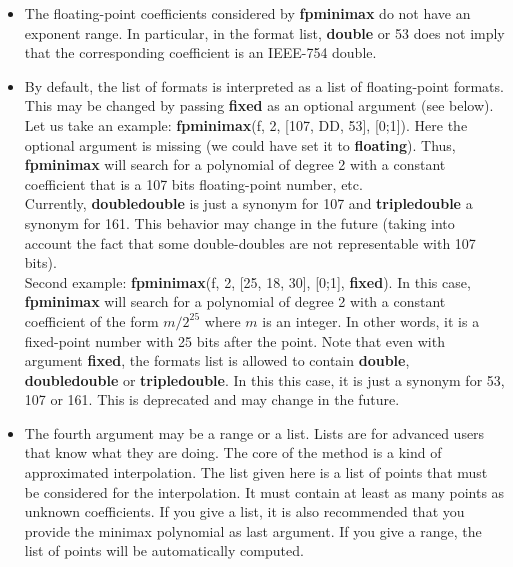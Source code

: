 \begin{itemize}
\item The floating-point coefficients considered by \textbf{fpminimax} do not have an
   exponent range. In particular, in the format list, \textbf{double} or 53 does not
   imply that the corresponding coefficient is an IEEE-754 double.

\item By default, the list of formats is interpreted as a list of floating-point
   formats. This may be changed by passing \textbf{fixed} as an optional argument (see
   below). Let us take an example: \textbf{fpminimax}(f, 2, [107, DD, 53], [0;1]).
   Here the optional argument is missing (we could have set it to \textbf{floating}).
   Thus, \textbf{fpminimax} will search for a polynomial of degree 2 with a constant 
   coefficient that is a 107 bits floating-point number, etc.\\
   Currently, \textbf{doubledouble} is just a synonym for 107 and \textbf{tripledouble} a 
   synonym for 161. This behavior may change in the future (taking into
   account the fact that some double-doubles are not representable with
   107 bits).\\
   Second example: \textbf{fpminimax}(f, 2, [25, 18, 30], [0;1], \textbf{fixed}).
   In this case, \textbf{fpminimax} will search for a polynomial of degree 2 with a
   constant coefficient of the form $m/2^{25}$ where $m$ is an
   integer. In other words, it is a fixed-point number with 25 bits after
   the point. Note that even with argument \textbf{fixed}, the formats list is 
   allowed to contain \textbf{double}, \textbf{doubledouble} or \textbf{tripledouble}. In this this
   case, it is just a synonym for 53, 107 or 161. This is deprecated and may
   change in the future.

\item The fourth argument may be a range or a list. Lists are for advanced users
   that know what they are doing. The core of the  method is a kind of
   approximated interpolation. The list given here is a list of points that
   must be considered for the interpolation. It must contain at least as 
   many points as unknown coefficients. If you give a list, it is also 
   recommended that you provide the minimax polynomial as last argument.
   If you give a range, the list of points will be automatically computed.


\end{itemize}
